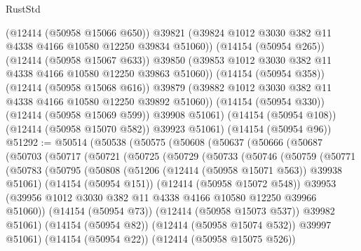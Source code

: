 \begin{lexlean}{RustStd}
\begin{coremodule}
{\begin{coremodule}
{{{{{{{{{{{{{{{{{{{{{{{{{{{{{{{{{{{{{{{{{{{{{{{{{{              (@12414 (@50958 @15066 @650))
              @39821
              (@39824 @1012 @3030 @382 @11 @4338 @4166 @10580 @12250 @39834 @51060))
            (@14154 (@50954 @265))
            (@12414 (@50958 @15067 @633))
            @39850
            (@39853 @1012 @3030 @382 @11 @4338 @4166 @10580 @12250 @39863 @51060))
          (@14154 (@50954 @358))
          (@12414 (@50958 @15068 @616))
          @39879
          (@39882 @1012 @3030 @382 @11 @4338 @4166 @10580 @12250 @39892 @51060))
        (@14154 (@50954 @330))
        (@12414 (@50958 @15069 @599))
        @39908
        @51061)
      (@14154 (@50954 @108))
      (@12414 (@50958 @15070 @582))
      @39923
      @51061)
    (@14154 (@50954 @96))
@51292 := @50514
    (@50538
      (@50575
        (@50608
          (@50637
            (@50666
              (@50687
                (@50703
                  (@50717
                    (@50721
                      (@50725
                        (@50729
                          (@50733
                            (@50746
                              (@50759
                                (@50771
                                  (@50783
                                    (@50795
                                      (@50808
                                        (@51206 (@12414 (@50958 @15071 @563)) @39938 @51061)
                                        (@14154 (@50954 @151))
                                        (@12414 (@50958 @15072 @548))
                                        @39953
                                        (@39956
                                          @1012
                                          @3030
                                          @382
                                          @11
                                          @4338
                                          @4166
                                          @10580
                                          @12250
                                          @39966
                                          @51060))
                                      (@14154 (@50954 @73))
                                      (@12414 (@50958 @15073 @537))
                                      @39982
                                      @51061)
                                    (@14154 (@50954 @82))
                                    (@12414 (@50958 @15074 @532))
                                    @39997
                                    @51061)
                                  (@14154 (@50954 @22))
                                  (@12414 (@50958 @15075 @526))
}}}}}}}}}}}}}}}}}}}}}}}}}}}}}}}}}}}}}}}}}}}}}}}}}}
\end{coremodule}}
\end{coremodule}
\end{lexlean}
